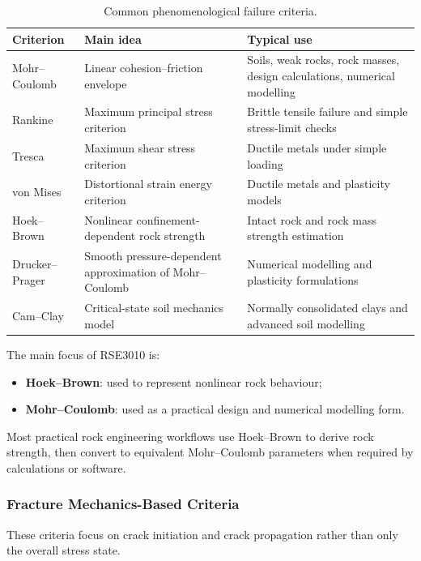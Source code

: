 \begin{table}[H]
\centering
\small
\begin{tabularx}{\textwidth}{l Y Y}
\toprule
\textbf{Criterion} & \textbf{Main idea} & \textbf{Typical use} \\
\midrule
Mohr--Coulomb & Linear cohesion--friction envelope & Soils, weak rocks, rock masses, design calculations, numerical modelling \\
Rankine & Maximum principal stress criterion & Brittle tensile failure and simple stress-limit checks \\
Tresca & Maximum shear stress criterion & Ductile metals under simple loading \\
von Mises & Distortional strain energy criterion & Ductile metals and plasticity models \\
Hoek--Brown & Nonlinear confinement-dependent rock strength & Intact rock and rock mass strength estimation \\
Drucker--Prager & Smooth pressure-dependent approximation of Mohr--Coulomb & Numerical modelling and plasticity formulations \\
Cam--Clay & Critical-state soil mechanics model & Normally consolidated clays and advanced soil modelling \\
\bottomrule
\end{tabularx}
\caption{Common phenomenological failure criteria.}
\end{table}

\begin{notebox}
The main focus of RSE3010 is:
\begin{itemize}
 \item \textbf{Hoek--Brown}: used to represent nonlinear rock behaviour;
 \item \textbf{Mohr--Coulomb}: used as a practical design and numerical modelling form.
\end{itemize}
Most practical rock engineering workflows use Hoek--Brown to derive rock strength, then
convert to equivalent Mohr--Coulomb parameters when required by calculations or software.
\end{notebox}

\subsubsection{Fracture Mechanics-Based Criteria}

These criteria focus on crack initiation and crack propagation rather than only the overall
stress state.

